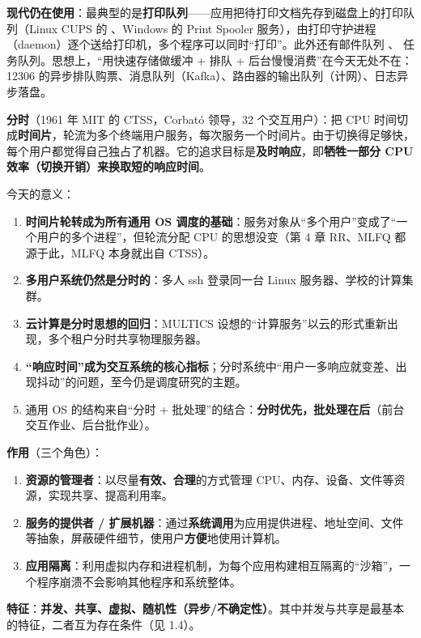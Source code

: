 \textbf{现代仍在使用}：最典型的是\textbf{打印队列}——应用把待打印文档先存到磁盘上的打印队列（Linux CUPS 的 、Windows 的 Print Spooler 服务），由打印守护进程（daemon）逐个送给打印机，多个程序可以同时“打印”。此外还有邮件队列 、 任务队列。思想上，“用快速存储做缓冲 + 排队 + 后台慢慢消费”在今天无处不在：12306 的异步排队购票、消息队列（Kafka）、路由器的输出队列（计网）、日志异步落盘。

\textbf{分时}（1961 年 MIT 的 CTSS，Corbató 领导，32 个交互用户）：把 CPU 时间切成\textbf{时间片}，轮流为多个终端用户服务，每次服务一个时间片。由于切换得足够快，每个用户都觉得自己独占了机器。它的追求目标是\textbf{及时响应}，即\textbf{牺牲一部分 CPU 效率（切换开销）来换取短的响应时间}。

今天的意义：
\begin{enumerate}
    \item \textbf{时间片轮转成为所有通用 OS 调度的基础}：服务对象从“多个用户”变成了“一个用户的多个进程”，但轮流分配 CPU 的思想没变（第 4 章 RR、MLFQ 都源于此，MLFQ 本身就出自 CTSS）。
    \item \textbf{多用户系统仍然是分时的}：多人 ssh 登录同一台 Linux 服务器、学校的计算集群。
    \item \textbf{云计算是分时思想的回归}：MULTICS 设想的“计算服务”以云的形式重新出现，多个租户分时共享物理服务器。
    \item \textbf{“响应时间”成为交互系统的核心指标}；分时系统中“用户一多响应就变差、出现抖动”的问题，至今仍是调度研究的主题。
    \item 通用 OS 的结构来自“分时 + 批处理”的结合：\textbf{分时优先，批处理在后}（前台交互作业、后台批作业）。
\end{enumerate}

\textbf{作用}（三个角色）：
\begin{enumerate}
    \item \textbf{资源的管理者}：以尽量\textbf{有效、合理}的方式管理 CPU、内存、设备、文件等资源，实现共享、提高利用率。
    \item \textbf{服务的提供者 / 扩展机器}：通过\textbf{系统调用}为应用提供进程、地址空间、文件等抽象，屏蔽硬件细节，使用户\textbf{方便}地使用计算机。
    \item \textbf{应用隔离}：利用虚拟内存和进程机制，为每个应用构建相互隔离的“沙箱”，一个程序崩溃不会影响其他程序和系统整体。
\end{enumerate}
\textbf{特征}：\textbf{并发、共享、虚拟、随机性（异步/不确定性）}。其中并发与共享是最基本的特征，二者互为存在条件（见 1.4）。


